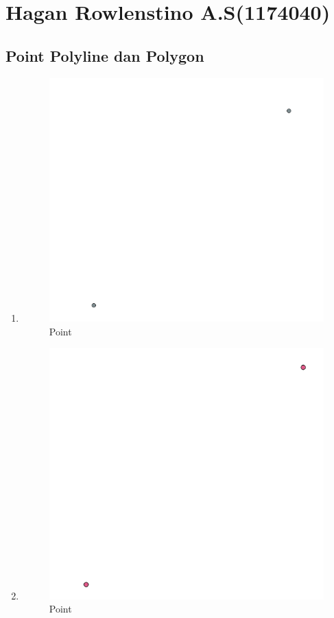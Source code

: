 \section{Hagan Rowlenstino A.S(1174040)}
\subsection{Point Polyline dan Polygon}
\begin{enumerate}
	\item 
	
	\begin{figure}[H]
		\includegraphics[width=12cm]{figures/1174040/Python1/Soal1.PNG}
		\centering
		\caption{Point}
	\end{figure}
	
	\item 
	
	\begin{figure}[H]
		\includegraphics[width=12cm]{figures/1174040/Python1/Soal2.PNG}
		\centering
		\caption{Point}
	\end{figure}
	

\end{enumerate}
